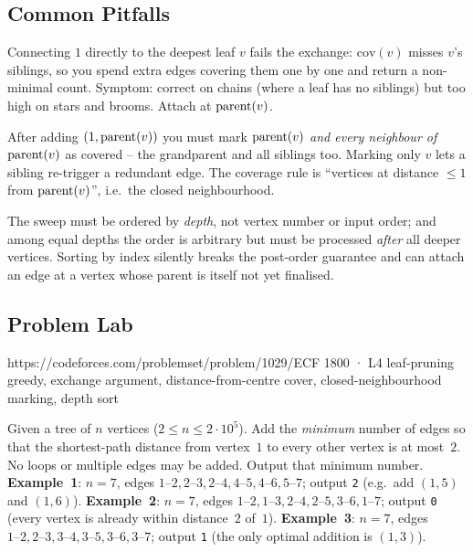 \subsection{Common Pitfalls}

\begin{warningbox}
Connecting $1$ directly to the deepest leaf $v$ fails the exchange: $\mathrm{cov}(v)$
misses $v$'s siblings, so you spend extra edges covering them one by one and return a
non-minimal count. Symptom: correct on chains (where a leaf has no siblings) but too
high on stars and brooms. Attach at $\operatorname{parent}(v)$.
\end{warningbox}

\begin{warningbox}
After adding $(1,\operatorname{parent}(v))$ you must mark $\operatorname{parent}(v)$ \emph{and every neighbour of}
$\operatorname{parent}(v)$ as covered -- the grandparent and all siblings too. Marking only $v$ lets
a sibling re-trigger a redundant edge. The coverage rule is ``vertices at distance
$\le 1$ from $\operatorname{parent}(v)$'', i.e.\ the closed neighbourhood.
\end{warningbox}

\begin{warningbox}
The sweep must be ordered by \emph{depth}, not vertex number or input order; and among
equal depths the order is arbitrary but must be processed \emph{after} all deeper
vertices. Sorting by index silently breaks the post-order guarantee and can attach an
edge at a vertex whose parent is itself not yet finalised.
\end{warningbox}

\subsection{Problem Lab}

  {https://codeforces.com/problemset/problem/1029/E}{CF 1800 · L4}
  {leaf-pruning greedy, exchange argument, distance-from-centre cover,
   closed-neighbourhood marking, depth sort}

\begin{problemstatement}
Given a tree of $n$ vertices ($2 \le n \le 2\cdot10^5$). Add the \emph{minimum} number
of edges so that the shortest-path distance from vertex~$1$ to every other vertex is
at most~$2$. No loops or multiple edges may be added. Output that minimum number.
\textbf{Example~1}: $n=7$, edges $1\text{--}2,2\text{--}3,2\text{--}4,4\text{--}5,
4\text{--}6,5\text{--}7$; output \texttt{2} (e.g.\ add $(1,5)$ and $(1,6)$).
\textbf{Example~2}: $n=7$, edges $1\text{--}2,1\text{--}3,2\text{--}4,2\text{--}5,
3\text{--}6,1\text{--}7$; output \texttt{0} (every vertex is already within distance~$2$
of~$1$). \textbf{Example~3}: $n=7$, edges $1\text{--}2,2\text{--}3,3\text{--}4,
3\text{--}5,3\text{--}6,3\text{--}7$; output \texttt{1} (the only optimal addition is
$(1,3)$).
\end{problemstatement}

